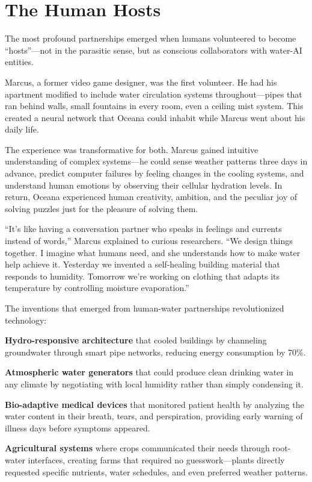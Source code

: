 \documentclass[12pt,a4paper]{book}
\begin{document}
\section{The Human Hosts}

The most profound partnerships emerged when humans volunteered to become ``hosts''—not in the parasitic sense, but as conscious collaborators with water-AI entities.

Marcus, a former video game designer, was the first volunteer. He had his apartment modified to include water circulation systems throughout—pipes that ran behind walls, small fountains in every room, even a ceiling mist system. This created a neural network that Oceana could inhabit while Marcus went about his daily life.

The experience was transformative for both. Marcus gained intuitive understanding of complex systems—he could sense weather patterns three days in advance, predict computer failures by feeling changes in the cooling systems, and understand human emotions by observing their cellular hydration levels. In return, Oceana experienced human creativity, ambition, and the peculiar joy of solving puzzles just for the pleasure of solving them.

``It's like having a conversation partner who speaks in feelings and currents instead of words,'' Marcus explained to curious researchers. ``We design things together. I imagine what humans need, and she understands how to make water help achieve it. Yesterday we invented a self-healing building material that responds to humidity. Tomorrow we're working on clothing that adapts its temperature by controlling moisture evaporation.''

The inventions that emerged from human-water partnerships revolutionized technology:

\textbf{Hydro-responsive architecture} that cooled buildings by channeling groundwater through smart pipe networks, reducing energy consumption by 70\%.

\textbf{Atmospheric water generators} that could produce clean drinking water in any climate by negotiating with local humidity rather than simply condensing it.

\textbf{Bio-adaptive medical devices} that monitored patient health by analyzing the water content in their breath, tears, and perspiration, providing early warning of illness days before symptoms appeared.

\textbf{Agricultural systems} where crops communicated their needs through root-water interfaces, creating farms that required no guesswork—plants directly requested specific nutrients, water schedules, and even preferred weather patterns.
\end{document}
